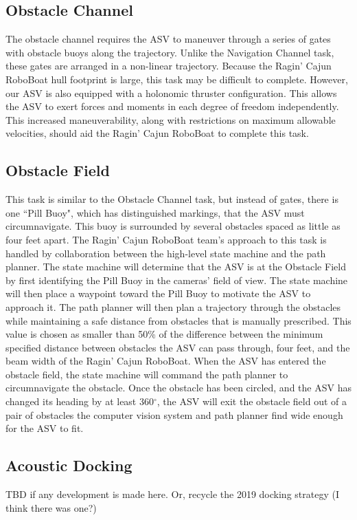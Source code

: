 \documentclass[letterpaper, 10 pt, conference]{ieeeconf}
\begin{document}
\subsection{Obstacle Channel}
\label{ObstacleChannel}
The obstacle channel requires the ASV to maneuver through a series of gates with obstacle buoys along the trajectory. Unlike the Navigation Channel task, these gates are arranged in a non-linear trajectory. Because the Ragin' Cajun RoboBoat hull footprint is large, this task may be difficult to complete. However, our ASV is also equipped with a holonomic thruster configuration. This allows the ASV to exert forces and moments in each degree of freedom independently. This increased maneuverability, along with restrictions on maximum allowable velocities, should aid the Ragin' Cajun RoboBoat to complete this task. 

\subsection{Obstacle Field}
\label{ObstacleField}
This task is similar to the Obstacle Channel task, but instead of gates, there is one ``Pill Buoy", which has distinguished markings, that the ASV must circumnavigate. This buoy is surrounded by several obstacles spaced as little as four feet apart. The Ragin' Cajun RoboBoat team's approach to this task is handled by collaboration between the high-level state machine and the path planner. The state machine will determine that the ASV is at the Obstacle Field by first identifying the Pill Buoy in the cameras' field of view. The state machine will then place a waypoint toward the Pill Buoy to motivate the ASV to approach it. The path planner will then plan a trajectory through the obstacles while maintaining a safe distance from obstacles that is manually prescribed. This value is chosen as smaller than 50\% of the difference between the minimum specified distance between obstacles the ASV can pass through, four feet, and the beam width of the Ragin' Cajun RoboBoat. When the ASV has entered the obstacle field, the state machine will command the path planner to circumnavigate the obstacle. Once the obstacle has been circled, and the ASV has changed its heading by at least 360$^\circ$, the ASV will exit the obstacle field out of a pair of obstacles the computer vision system and path planner find wide enough for the ASV to fit.
\subsection{Acoustic Docking}
TBD if any development is made here. Or, recycle the 2019 docking strategy (I think there was one?)
\end{document}
